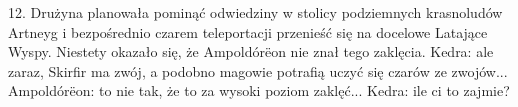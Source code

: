 \documentclass[10pt,twoside,twocolumn]{book}
\begin{document}
12. Drużyna planowała pominąć odwiedziny w stolicy podziemnych krasnoludów Artneyg i bezpośrednio czarem teleportacji przenieść się na docelowe Latające Wyspy. Niestety okazało się, że Ampoldórëon nie znał tego zaklęcia.
Kedra: ale zaraz, Skirfir ma zwój, a podobno magowie potrafią uczyć się czarów ze zwojów...
Ampoldórëon: to nie tak, że to za wysoki poziom zaklęć...
Kedra: ile ci to zajmie?



%    
%       
\end{document}

